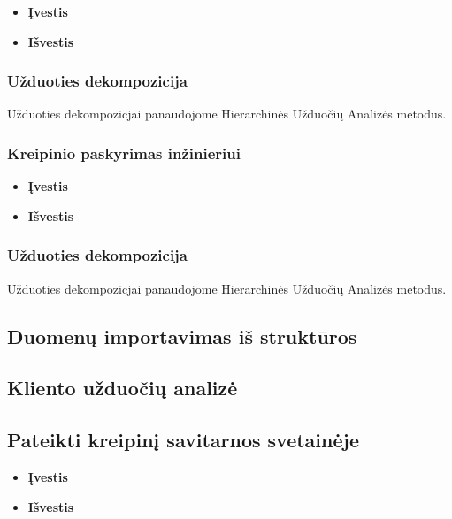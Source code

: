 		\begin{itemize}
			\item \textbf{Įvestis}
			\item \textbf{Išvestis} 
		\end{itemize}
		
	\subsubsection {Užduoties dekompozicija}

	Užduoties dekompozicjai panaudojome Hierarchinės Užduočių Analizės metodus.

	\subsubsection {Kreipinio paskyrimas inžinieriui}

		\begin{itemize}
			\item \textbf{Įvestis}
			\item \textbf{Išvestis} 
		\end{itemize}
		
	\subsubsection {Užduoties dekompozicija}

	Užduoties dekompozicjai panaudojome Hierarchinės Užduočių Analizės metodus.
	\subsection {Duomenų importavimas iš struktūros}
	
\subsection {Kliento užduočių analizė}

	\subsection {Pateikti kreipinį savitarnos svetainėje}
		
		\begin{itemize}
			\item \textbf{Įvestis}
			\item \textbf{Išvestis} 
		\end{itemize}

